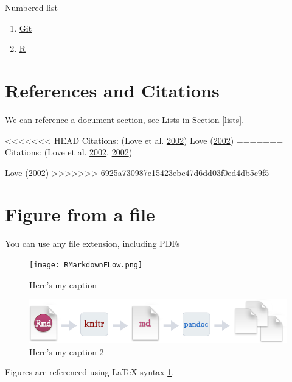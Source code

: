 \documentclass[12pt,]{article}
\begin{document}
Numbered list

\begin{enumerate}[noitemsep,nolistsep,topsep=0pt]

\item \href{https://git-scm.com/book/en/v2/Getting-Started-Installing-Git}{Git}

\item \href{https://cran.r-project.org/bin/windows/base/}{R} 

\end{enumerate}

\section{References and Citations}\label{references-and-citations}

We can reference a document section, see Lists in Section \ref{lists}.

<<<<<<< HEAD
Citations: (Love et al. \protect\hyperlink{ref-Love2002}{2002}) Love
(\protect\hyperlink{ref-Love2002}{2002})
=======
Citations: (Love et al. \protect\hyperlink{ref-Love2002}{2002},
\protect\hyperlink{ref-Love2002}{2002})

Love (\protect\hyperlink{ref-Love2002}{2002})
>>>>>>> 6925a730987e15423ebc47d6dd03f0ed4db5c9f5

\section{Figure from a file}\label{figure-from-a-file}

You can use any file extension, including PDFs

\begin{figure}[htbp]
\centering
\texttt{[image: RMarkdownFLow.png]}
\caption{Here's my caption \label{fig:fig_example}}
\end{figure}

\begin{figure}[htbp]
\centering
\includegraphics{./Figures/RMarkdownFLow1.png}
\caption{Here's my caption 2 \label{fig:fig_example2}}
\end{figure}

Figures are referenced using LaTeX syntax \ref{fig:fig_example}.
\end{document}
